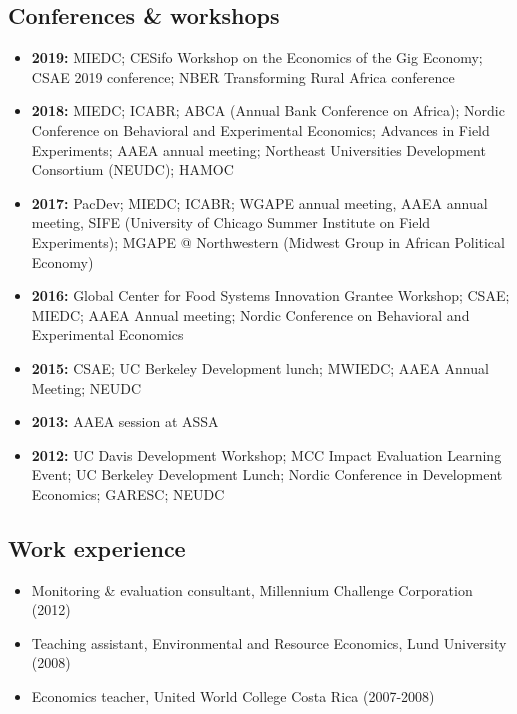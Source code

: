 \documentclass[11pt]{article}
\begin{document}
\subsection*{\sc Conferences \& workshops}
\begin{itemize}[itemsep=.9pt, leftmargin=20pt]
    \item[]\textbf{2019:} MIEDC; CESifo Workshop on the Economics of the Gig Economy; CSAE 2019 conference; NBER Transforming Rural Africa conference 
    \item[]\textbf{2018:} MIEDC; ICABR; ABCA (Annual Bank Conference on Africa); Nordic Conference on Behavioral and Experimental Economics; Advances in Field Experiments; AAEA annual meeting; Northeast Universities Development Consortium (NEUDC); HAMOC
    \item[]\textbf{2017:} PacDev; MIEDC; ICABR; WGAPE annual meeting, AAEA annual meeting, SIFE (University of Chicago Summer Institute on Field Experiments); MGAPE @ Northwestern (Midwest Group in African Political Economy)
    \item[]\textbf{2016:} Global Center for Food Systems Innovation Grantee Workshop; CSAE; MIEDC; AAEA Annual meeting; Nordic Conference on Behavioral and Experimental Economics 
    \item[]\textbf{2015:} CSAE; UC Berkeley Development lunch; MWIEDC; AAEA Annual Meeting; NEUDC
    \item[]\textbf{2013:} AAEA session at ASSA
   \item[]\textbf{2012:} UC Davis Development Workshop; MCC Impact Evaluation Learning Event; UC Berkeley Development Lunch; Nordic Conference in Development Economics; GARESC; NEUDC
\end{itemize}


\subsection*{\sc Work experience}
\begin{itemize}[leftmargin=20pt]
    \itemsep-.1cm
    \item[]Monitoring \& evaluation consultant, Millennium Challenge Corporation (2012)
    \item[] Teaching assistant, Environmental and Resource Economics, Lund University (2008)
    \item[]Economics teacher, United World College Costa Rica (2007-2008)    
\end{itemize}
\end{document}
